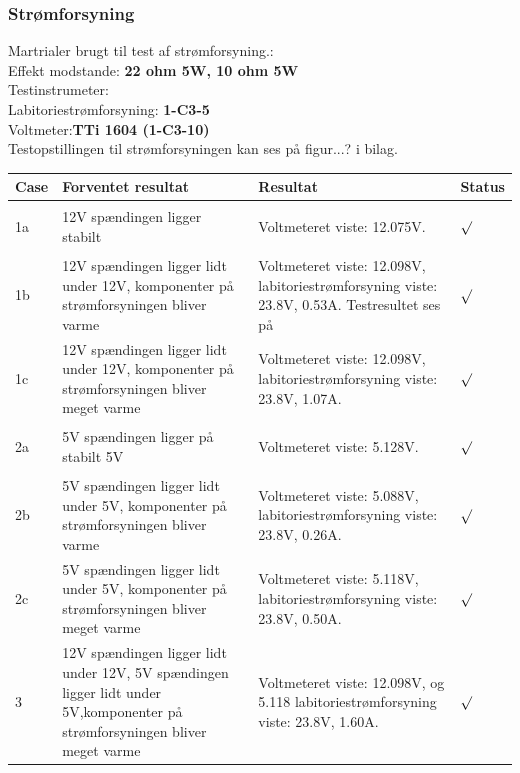 \subsubsection{Strømforsyning}
Martrialer brugt til test af strømforsyning.:\\
Effekt modstande: \textbf{22 ohm 5W, 10 ohm 5W} \\
Testinstrumeter:\\
Labitoriestrømforsyning: \textbf{1-C3-5} \\
Voltmeter:\textbf{TTi 1604 (1-C3-10)} \\
Testopstillingen til strømforsyningen kan ses på figur...? i bilag.\\
\begin{table}[H]
\centering
\begin{tabular}{| p{1cm}  | p{4cm} | p{6cm} | p{1cm} |}
\hline
Case &Forventet resultat &Resultat &Status\\\hline
1a &12V spændingen ligger stabilt &Voltmeteret viste: 12.075V.& \begin{Huge}$\surd$\end{Huge} \\ \hline 
1b &12V spændingen ligger lidt under 12V, komponenter på strømforsyningen bliver varme &Voltmeteret viste: 12.098V, labitoriestrømforsyning viste: 23.8V, 0.53A. Testresultet ses på & \begin{Huge}$\surd$\end{Huge}\\ \hline
1c &12V spændingen ligger lidt under 12V, komponenter på strømforsyningen bliver meget varme &Voltmeteret viste: 12.098V, labitoriestrømforsyning viste: 23.8V, 1.07A.& \begin{Huge}$\surd$\end{Huge}\\ \hline
2a &5V spændingen ligger på stabilt 5V &Voltmeteret viste: 5.128V. & \begin{Huge}$\surd$\end{Huge} \\ \hline 
2b &5V spændingen ligger lidt under 5V, komponenter på strømforsyningen bliver varme &Voltmeteret viste: 5.088V, labitoriestrømforsyning viste: 23.8V, 0.26A. & \begin{Huge}$\surd$\end{Huge}\\ \hline
2c &5V spændingen ligger lidt under 5V, komponenter på strømforsyningen bliver meget varme &Voltmeteret viste: 5.118V, labitoriestrømforsyning viste: 23.8V, 0.50A. & \begin{Huge}$\surd$\end{Huge}\\ \hline
3 &12V spændingen ligger lidt under 12V, 5V spændingen ligger lidt under 5V,komponenter på strømforsyningen bliver meget varme &Voltmeteret viste: 12.098V, og 5.118 labitoriestrømforsyning viste: 23.8V, 1.60A. & \begin{Huge}$\surd$\end{Huge}\\ \hline
\end{tabular}
\end{table}

